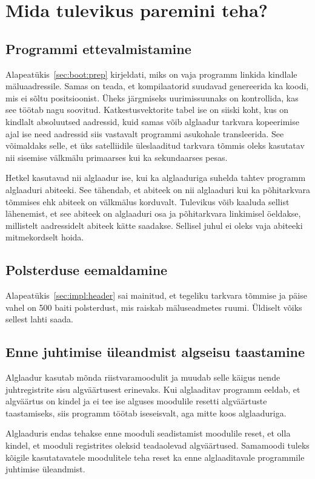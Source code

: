 \documentclass[12pt,a4paper]{article}
\begin{document}
\label{sec:prob:beat}
\section{Mida tulevikus paremini teha?}
\subsection{Programmi ettevalmistamine}
Alapeatükis~\ref{sec:boot:prep} kirjeldati, miks on vaja programm linkida kindlale
mäluaadressile. Samas on teada, et kompilaatorid suudavad genereerida ka koodi,
mis ei sõltu positsioonist. Üheks järgmiseks uurimissuunaks on kontrollida, kas
see töötab nagu soovitud. Katkestusvektorite tabel ise on siiski koht, kus on
kindlalt absoluutsed aadressid, kuid samas võib alglaadur tarkvara kopeerimise
ajal ise need aadressid siis vastavalt programmi asukohale transleerida. See
võimaldaks selle, et üks satelliidile üleslaaditud tarkvara tõmmis oleks kasutatav
nii sisemise välkmälu primaarses kui ka sekundaarses pesas.

Hetkel kasutavad nii alglaadur ise, kui ka alglaaduriga suhelda tahtev programm
alglaaduri abiteeki. See tähendab, et abiteek on nii alglaaduri kui ka
põhitarkvara tõmmises ehk abiteek on välkmälus korduvalt. Tulevikus võib
kaaluda sellist lähenemist, et see abiteek on alglaaduri osa ja põhitarkvara
linkimisel öeldakse, millistelt aadressidelt abiteek kätte saadakse. Sellisel
juhul ei oleks vaja abiteeki mitmekordselt hoida.

\subsection{Polsterduse eemaldamine}
Alapeatükis~\ref{sec:impl:header} sai mainitud, et tegeliku tarkvara tõmmise ja
päise vahel on 500 baiti polsterdust, mis raiskab mäluseadmetes ruumi. Üldiselt
võiks sellest lahti saada.

\subsection{Enne juhtimise üleandmist algseisu taastamine}
Alglaadur kasutab mõnda riistvaramoodulit ja muudab selle käigus nende
juhtregistrite sisu algväärtusest erinevaks. Kui alglaaditav programm eeldab,
et algväärtus on kindel ja ei tee ise alguses moodulile resetti algväärtuste
taastamiseks, siis programm töötab iseseisvalt, aga mitte koos alglaaduriga.

Alglaaduris endas tehakse enne mooduli seadistamist moodulile reset, et olla
kindel, et mooduli registrites oleksid teadaolevad algväärtused. Samamoodi
tuleks kõigile kasutatavatele moodulitele teha reset ka enne alglaaditavale
programmile juhtimise üleandmist.
\end{document}
